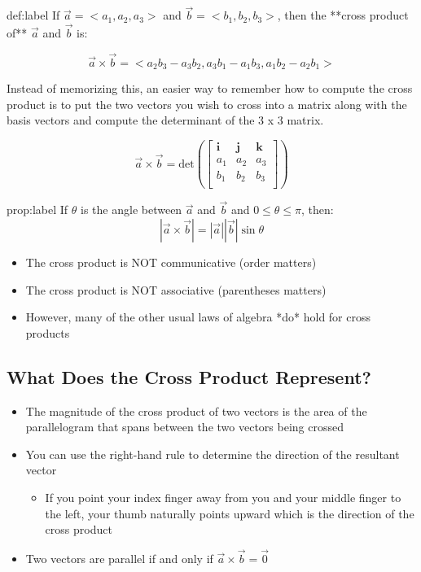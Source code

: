 \documentclass{package/notes}
\begin{document}
	\begin{definition}{def:label}
		If $\vec a = <a_1,a_2,a_3>$ and $\vec b = <b_1,b_2,b_3>$, then the **cross product of** $\vec a$ and $\vec b$ is:

		$$\vec a \times \vec b = <a_2b_3 - a_3b_2, a_3b_1-a_1b_3, a_1b_2 - a_2b_1>$$

		Instead of memorizing this, an easier way to remember how to compute the cross product is to put the two vectors you wish to cross into a matrix along with the basis vectors and compute the determinant of the 3 x 3 matrix.

		$$
		\vec a \times \vec b = \text{det}\left(\left[
		\begin{array}{ccc}
		\mathbf i & \mathbf j & \mathbf k\\
		a_1 & a_2 & a_3 \\
		b_1 & b_2 & b_3 \\
		\end{array}
		\right]\right)
		$$
	\end{definition}

	\begin{proposition}{prop:label}
		If $\theta$ is the angle between $\vec a$ and $\vec b$ and $0\le\theta\le\pi$, then:
		$$|\vec a \times \vec b | = |\vec a||\vec b| \sin\theta$$
	\end{proposition}

	\begin{itemize}
		\item The cross product is NOT communicative (order matters)
		\item The cross product is NOT associative (parentheses matters)
		\item However, many of the other usual laws of algebra *do* hold for cross products
	\end{itemize}

\subsection{What Does the Cross Product Represent?}

	\begin{itemize}
		\item The magnitude of the cross product of two vectors is the area of the parallelogram that spans between the two vectors being crossed
		\item You can use the right-hand rule to determine the direction of the resultant vector
		\begin{itemize}
			\item If you point your index finger away from you and your middle finger to the left, your thumb  naturally points upward which is the direction of the cross product
		\end{itemize}
		\item Two vectors are parallel if and only if $\vec a \times \vec b = \vec 0$ 
	\end{itemize}
\end{document}
